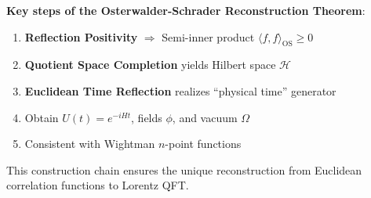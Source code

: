 \documentclass[11pt]{article}
\theoremstyle{definition}
\theoremstyle{remark}
\begin{document}
\textbf{Key steps of the Osterwalder-Schrader Reconstruction Theorem}:

\begin{enumerate}
\item \textbf{Reflection Positivity} \( \Rightarrow \) Semi-inner product \( \langle f,f\rangle_{\text{OS}}\ge0 \)
\item \textbf{Quotient Space Completion} yields Hilbert space \( \mathcal{H} \)
\item \textbf{Euclidean Time Reflection} realizes ``physical time'' generator
\item Obtain \( U(t)=e^{-iHt} \), fields \( \phi \), and vacuum \( \Omega \)
\item Consistent with Wightman \( n \)-point functions
\end{enumerate}

This construction chain ensures the unique reconstruction from Euclidean correlation functions to Lorentz QFT.
\end{document}
